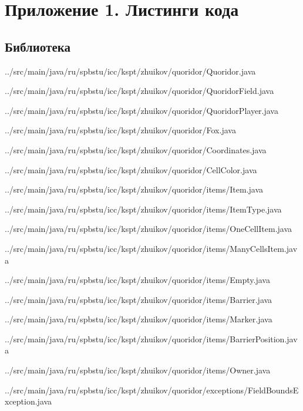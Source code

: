 \documentclass[a4paper]{article}
\begin{document}
\newpage
\section{Приложение 1. Листинги кода}
\subsection{Библиотека}

{../src/main/java/ru/spbstu/icc/kspt/zhuikov/quoridor/Quoridor.java}
\newpage


{../src/main/java/ru/spbstu/icc/kspt/zhuikov/quoridor/QuoridorField.java}
\newpage


{../src/main/java/ru/spbstu/icc/kspt/zhuikov/quoridor/QuoridorPlayer.java}
\newpage


{../src/main/java/ru/spbstu/icc/kspt/zhuikov/quoridor/Fox.java}
\newpage


{../src/main/java/ru/spbstu/icc/kspt/zhuikov/quoridor/Coordinates.java}
\newpage


{../src/main/java/ru/spbstu/icc/kspt/zhuikov/quoridor/CellColor.java}
\newpage


{../src/main/java/ru/spbstu/icc/kspt/zhuikov/quoridor/items/Item.java}


{../src/main/java/ru/spbstu/icc/kspt/zhuikov/quoridor/items/ItemType.java}


{../src/main/java/ru/spbstu/icc/kspt/zhuikov/quoridor/items/OneCellItem.java}


{../src/main/java/ru/spbstu/icc/kspt/zhuikov/quoridor/items/ManyCellsItem.java}


{../src/main/java/ru/spbstu/icc/kspt/zhuikov/quoridor/items/Empty.java}


{../src/main/java/ru/spbstu/icc/kspt/zhuikov/quoridor/items/Barrier.java}


{../src/main/java/ru/spbstu/icc/kspt/zhuikov/quoridor/items/Marker.java}


{../src/main/java/ru/spbstu/icc/kspt/zhuikov/quoridor/items/BarrierPosition.java}


{../src/main/java/ru/spbstu/icc/kspt/zhuikov/quoridor/items/Owner.java}
\newpage


{../src/main/java/ru/spbstu/icc/kspt/zhuikov/quoridor/exceptions/FieldBoundsException.java}
\end{document}
